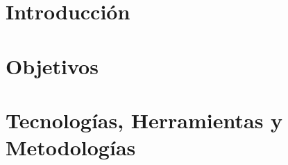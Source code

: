 \documentclass[11pt,twoside,titlepage]{report}
\begin{document}






\pagestyle{fancy}


\renewcommand{\chaptermark}[1]{\markboth{Capítulo \thechapter.\ #1}{}}

\pagestyle{fancy}
\fancyhf{}
\fancyhead[LO]{\leftmark}
\fancyhead[RO]{}
\fancyhead[RE]{\nouppercase\rightmark}
\fancyhead[LE]{}
\fancyfoot[C]{\thepage}










\chapter{Introducción}



\pagestyle{fancy}


\setlength{\parskip}{0.75em}
\renewcommand{\baselinestretch}{1.25}
\setcounter{page}{1}






\chapter{Objetivos}
\label{chap:objetivos}



\blankpage

\chapter{Tecnologías, Herramientas y Metodologías}
\label{chap:tecnologias}
\end{document}
